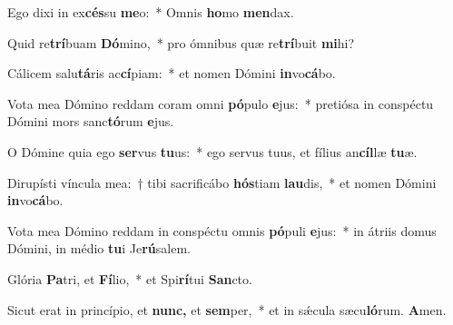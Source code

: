 \item Ego dixi in ex\textbf{cés}su \textbf{me}o:~* Omnis \textbf{ho}mo \textbf{men}dax.
\item Quid re\textbf{trí}buam \textbf{Dó}mino,~* pro ómnibus quæ re\textbf{trí}buit \textbf{mi}hi?
\item Cálicem salu\textbf{tá}ris ac\textbf{cí}piam:~* et nomen Dómini \textbf{in}vo\textbf{cá}bo.
\item Vota mea Dómino reddam coram omni \textbf{pó}pulo \textbf{e}jus:~* pretiósa in conspé\-ctu Dómini mors sanc\textbf{tó}rum \textbf{e}jus.
\item O Dómine quia ego \textbf{ser}vus \textbf{tu}us:~* ego servus tuus, et fílius an\textbf{cíl}læ \textbf{tu}æ.
\item Dirupísti víncula mea:~† tibi sacrificábo \textbf{hós}tiam \textbf{lau}dis,~* et nomen Dómini \textbf{in}vo\textbf{cá}bo.
\item Vota mea Dómino reddam in conspéctu omnis \textbf{pó}puli \textbf{e}jus:~* in átriis domus Dómini, in médio \textbf{tu}i Je\textbf{rú}salem.
\item Glória \textbf{Pa}tri, et \textbf{Fí}lio,~* et Spi\textbf{rí}tui \textbf{San}cto.
\item Sicut erat in princípio, et \textbf{nunc,} et \textbf{sem}per,~* et in sǽcula sæcu\textbf{ló}rum. \textbf{A}men.
